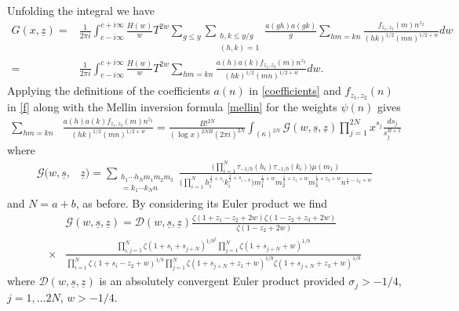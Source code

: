 \documentclass[oneside, 12pt]{amsart}
\theoremstyle{definition}
\newcommand{\mc}{\mathcal}
\newcommand{\ul}{\underline}
\newcommand{\leqs}{\leqslant }
\begin{document}
Unfolding the integral we have
\begin{align*}
G(x,\ul{z})
=  &
\frac{1}{2\pi i }\int_{c-i\infty}^{c+i\infty}
\frac{H(w)}{w}
T^{2w}
 \sum_{g\leqs y}\sum_{\substack{h,k\leqs y/g\\(h,k)=1}}\frac{a(gh)a(gk)}{g}\sum_{hm=kn}\frac{f_{z_1,z_3}(m) n^{z_2}}{(hk)^{1/2}(mn)^{1/2+w}} dw
\\
=  &
\frac{1}{2\pi i }\int_{c-i\infty}^{c+i\infty}
\frac{H(w)}{w}
T^{2w}
 \sum_{hm=kn}\frac{a(h)a(k)f_{z_1,z_3}(m) n^{z_2}}{(hk)^{1/2}(mn)^{1/2+w}} dw.
\end{align*}
Applying the definitions of the coefficients $a(n)$ in \eqref{coefficients} and $f_{z_1,z_2}(n)$ in \eqref{f} along with the Mellin inversion formula \eqref{mellin} for the weights $\psi(n)$ gives 
\begin{align*}
 \sum_{hm=kn}&\frac{a(h)a(k)f_{z_1,z_3}(m) n^{z_2}}{(hk)^{1/2}(mn)^{1/2+w}} 
 = \frac{B!^{2N}}{(\log x)^{2NB}(2\pi i)^{2N}}\int_{(\kappa)^{2N}}
       \mc{G}(w,\underline{s},\underline{z})\prod_{j=1}^{2N}x^{s_j}\frac{ds_j}{s_j^{B+1}}
\end{align*}
where
\begin{equation*}
\begin{split}
\label{mc G}
\mc{G}(w,\underline{s}, &\underline{z})
=
\!\!\!\!\!\!\!\!\!\sum_{\substack{h_1\cdots h_Nm_1m_2m_3 \\ = k_1\cdots k_Nn}}
  \frac{\Big(\prod_{i=1}^N \tau_{-1/b}(h_i)\tau_{-1/b}(k_i)\Big)\mu(m_1)}
          {\Big(\prod_{i=1}^{N}h_i^{\frac{1}{2}+s_i}k_i^{\frac{1}{2}+s_{i+N}}\Big)
          m_1^{\frac{1}{2}+w}m_2^{\frac{1}{2}+z_1+w}m_3^{\frac{1}{2}+z_3+w}n^{\frac{1}{2}-z_2+w}}
\end{split}
\end{equation*}
and $N=a+b$, as before. By considering its Euler product we find
\begin{equation}
\begin{split}
\label{mc G prod}
         &  \mc{G}(w,\underline{s}, \underline{z})
     =   
             \mc{D}(w,\ul{s},\ul{z})
             \frac{\zeta(1+z_1-z_2+2w)\zeta(1-z_2+z_3+2w)}{\zeta(1-z_2+2w)}
   \\  \times          
         &  \frac{\prod_{i,j=1}^N\zeta(1+s_i+s_{j+N})^{1/b^2}\prod_{j=1}^N\zeta(1+s_{j+N}+w)^{1/b}}
             {\prod_{i=1}^N\zeta(1+s_i-z_2+w)^{1/b}\prod_{j=1}^N\zeta(1+s_{j+N}+z_1+w)^{1/b}\zeta(1+s_{j+N}+z_3+w)^{1/b}}
\end{split}
\end{equation}
where $\mc{D}(w,\ul{s},\ul{z})$ is an absolutely convergent Euler product provided $\sigma_j>-1/4$, $j=1,\ldots 2N$, $w>-1/4$.
\end{document}
